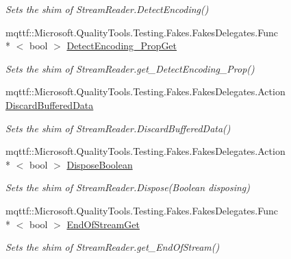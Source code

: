 \begin{DoxyCompactItemize}
\begin{DoxyCompactList}\small\item\em Sets the shim of Stream\-Reader.\-Detect\-Encoding()\end{DoxyCompactList}\item 
mqttf\-::\-Microsoft.\-Quality\-Tools.\-Testing.\-Fakes.\-Fakes\-Delegates.\-Func\\*
$<$ bool $>$ \hyperlink{class_system_1_1_i_o_1_1_fakes_1_1_shim_stream_reader_a45e07915ae31e6ef26acfe56c7b287cd}{Detect\-Encoding\-\_\-\-Prop\-Get}
\begin{DoxyCompactList}\small\item\em Sets the shim of Stream\-Reader.\-get\-\_\-\-Detect\-Encoding\-\_\-\-Prop()\end{DoxyCompactList}\item 
mqttf\-::\-Microsoft.\-Quality\-Tools.\-Testing.\-Fakes.\-Fakes\-Delegates.\-Action \hyperlink{class_system_1_1_i_o_1_1_fakes_1_1_shim_stream_reader_a8f4f8633dc8e0d4309170c5f8beb482a}{Discard\-Buffered\-Data}
\begin{DoxyCompactList}\small\item\em Sets the shim of Stream\-Reader.\-Discard\-Buffered\-Data()\end{DoxyCompactList}\item 
mqttf\-::\-Microsoft.\-Quality\-Tools.\-Testing.\-Fakes.\-Fakes\-Delegates.\-Action\\*
$<$ bool $>$ \hyperlink{class_system_1_1_i_o_1_1_fakes_1_1_shim_stream_reader_a1b8fc9d7f4de230c2ffa181dba94e392}{Dispose\-Boolean}
\begin{DoxyCompactList}\small\item\em Sets the shim of Stream\-Reader.\-Dispose(\-Boolean disposing)\end{DoxyCompactList}\item 
mqttf\-::\-Microsoft.\-Quality\-Tools.\-Testing.\-Fakes.\-Fakes\-Delegates.\-Func\\*
$<$ bool $>$ \hyperlink{class_system_1_1_i_o_1_1_fakes_1_1_shim_stream_reader_a9805d309d2e7959a18ec6e1a0eadf68c}{End\-Of\-Stream\-Get}
\begin{DoxyCompactList}\small\item\em Sets the shim of Stream\-Reader.\-get\-\_\-\-End\-Of\-Stream()\end{DoxyCompactList}\item 

\end{DoxyCompactItemize}
